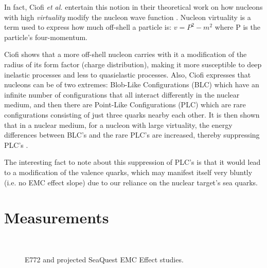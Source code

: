 \documentclass[11pt]{article}
\begin{document}
In fact, Ciofi \emph{et al.} entertain this notion in their theoretical work on how nucleons with high \emph{virtuality} modify the nucleon wave function \cite{PhysRevC.76.055206}. Nucleon virtuality is a term used to express how much off-shell a particle is: $v = P^2 - m^2$ where P is the particle's four-momentum.

Ciofi shows that a more off-shell nucleon carries with it a modification of the radius of its form factor (charge distribution), making it more susceptible to deep inelastic processes and less to quasielastic processes. Also, Ciofi expresses that nucleons can be of two extremes: Blob-Like Configurations (BLC) which have an infinite number of configurations that all interact differently in the nuclear medium, and then there are Point-Like Configurations (PLC) which are rare configurations consisting of just three quarks nearby each other. It is then shown that in a nuclear medium, for a nucleon with large virtuality, the energy differences between BLC's and the rare PLC's are increased, thereby suppressing PLC's \cite{PhysRevC.76.055206}.

The interesting fact to note about this suppression of PLC's is that it would lead to a modification of the valence quarks, which may manifest itself very bluntly (i.e. no EMC effect slope) due to our reliance on the nuclear target's sea quarks.

\section{Measurements}

\begin{figure}
\centering
\mbox{
	\quad
}
\caption{E772 and projected SeaQuest EMC Effect studies.}
\label{fig:e772_e906}
\end{figure}
\end{document}
